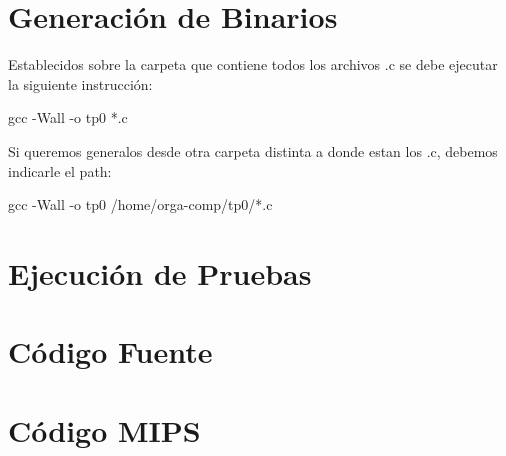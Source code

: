 \documentclass[12pt,a4paper,spanish]{article}
\begin{document}
\section{Generaci\'{o}n de Binarios}
Establecidos sobre la carpeta que contiene todos los archivos .c se debe ejecutar la siguiente instrucci\'{o}n:
\begin{center}
gcc -Wall -o tp0 *.c 
\end{center}
Si queremos generalos desde otra carpeta distinta a donde estan los .c, debemos indicarle el path:
\begin{center}
gcc -Wall -o tp0 /home/orga-comp/tp0/*.c
\end{center}


\section{Ejecuci\'{o}n de Pruebas}
\newpage
\section{C\'{o}digo Fuente}
\newpage
\section{C\'{o}digo MIPS}
\end{document}
